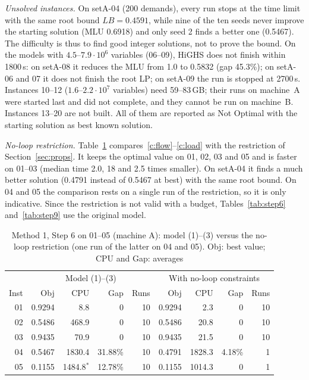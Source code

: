 \documentclass[conference]{IEEEtran}
\begin{document}
\emph{Unsolved instances.} On setA-04 (200 demands), every run stops at the time limit with the same root bound $LB=0.4591$, while nine of the ten seeds never improve the starting solution (MLU 0.6918) and only seed 2 finds a better one (0.5467). The difficulty is thus to find good integer solutions, not to prove the bound. On the models with $4.5$--$7.9\cdot10^6$ variables (06--09), HiGHS does not finish within 1800\,s: on setA-08 it reduces the MLU from 1.0 to 0.5832 (gap 45.3\%); on setA-06 and 07 it does not finish the root LP; on setA-09 the run is stopped at 2700\,s. Instances 10--12 ($1.6$--$2.2\cdot10^7$ variables) need 59--83\,GB; their runs on machine~A were started last and did not complete, and they cannot be run on machine~B. Instances 13--20 are not built. All of them are reported as Not Optimal with the starting solution as best known solution.

\emph{No-loop restriction.} Table~\ref{tab:noloop} compares~\eqref{c:flow}--\eqref{c:load} with the restriction of Section~\ref{sec:props}. It keeps the optimal value on 01, 02, 03 and 05 and is faster on 01--03 (median time 2.0, 18 and 2.5 times smaller). On setA-04 it finds a much better solution (0.4791 instead of 0.5467 at best) with the same root bound. On 04 and 05 the comparison rests on a single run of the restriction, so it is only indicative. Since the restriction is not valid with a budget, Tables~\ref{tab:step6} and~\ref{tab:step9} use the original model.

\begin{table}[t]
\centering\footnotesize
\caption{Method 1, Step 6 on 01--05 (machine A): model (1)--(3) versus the no-loop restriction (one run of the latter on 04 and 05). Obj: best value; CPU and Gap: averages}\label{tab:noloop}
\setlength{\tabcolsep}{3pt}
\begin{tabular}{@{}r|rrrr|rrrr@{}}
\toprule
 & \multicolumn{4}{c|}{Model (1)--(3)} & \multicolumn{4}{c}{With no-loop constraints}\\
Inst & Obj & CPU & Gap & Runs & Obj & CPU & Gap & Runs\\
\midrule
01 & 0.9294 & 8.8 & 0 & 10 & 0.9294 & 2.3 & 0 & 10\\
02 & 0.5486 & 468.9 & 0 & 10 & 0.5486 & 20.8 & 0 & 10\\
03 & 0.9435 & 70.9 & 0 & 10 & 0.9435 & 21.5 & 0 & 10\\
04 & 0.5467 & 1830.4 & 31.88\% & 10 & 0.4791 & 1828.3 & 4.18\% & 1\\
05 & 0.1155 & 1484.8$^*$ & 12.78\% & 10 & 0.1155 & 1014.3 & 0 & 1\\
\bottomrule
\end{tabular}
\end{table}
\end{document}
